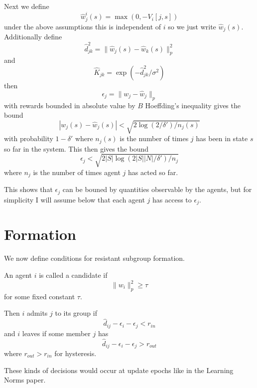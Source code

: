 \documentclass[11pt]{article}
\theoremstyle{definition}
\theoremstyle{remark}
\begin{document}
Next we define
\[ \hat{w}_j^i(s) = \max(0, -V_i[j, s]) \]
under the above assumptions this is independent of $i$ so we just write $\hat{w}_j(s)$.
Additionally define
\[ \hat{d}^2_{jk} = \| \hat{w}_j(s) - \hat{w}_k(s) \|^2_p \]
and
\[ \hat{K}_{jk} = \exp(-\hat{d}^2_{jk}/\sigma^2) \]
then
\[ \epsilon_j = \| w_j - \hat{w}_j \|_p \]
with rewards bounded in absolute value by $B$ Hoeffding's inequality
gives the bound
\[ | w_j(s) - \hat{w}_j(s) | < \sqrt{2\log(2/\delta')/n_j(s)} \]
with probability $1 - \delta'$ where $n_j(s)$ is the number of times $j$ has been in state $s$
so far in the system. This then gives the bound
\[ \epsilon_j < \sqrt{2|S|\log(2|S||N|/\delta')/n_j} \]
where $n_j$ is the number of times agent $j$ has acted so far.

This shows that $\epsilon_j$ can be bouned by quantities observable by the agents,
but for simplicity I will assume below that each agent $j$ has access to $\epsilon_j$.

\section{Formation}
We now define conditions for resistant subgroup formation.

An agent $i$ is called a candidate if
\[ \| w_i \|^2_p \geq \tau \]
for some fixed constant $\tau$.

Then $i$ admits $j$ to its group if
\[ \hat{d}_{ij} - \epsilon_i - \epsilon_j < r_{in} \]
and $i$ leaves if some member $j$ has
\[ \hat{d}_{ij} - \epsilon_i - \epsilon_j > r_{out} \]
where $r_{out} > r_{in}$ for hysteresis.

These kinds of decisions would occur at update epochs like in the Learning Norms paper.
\end{document}
